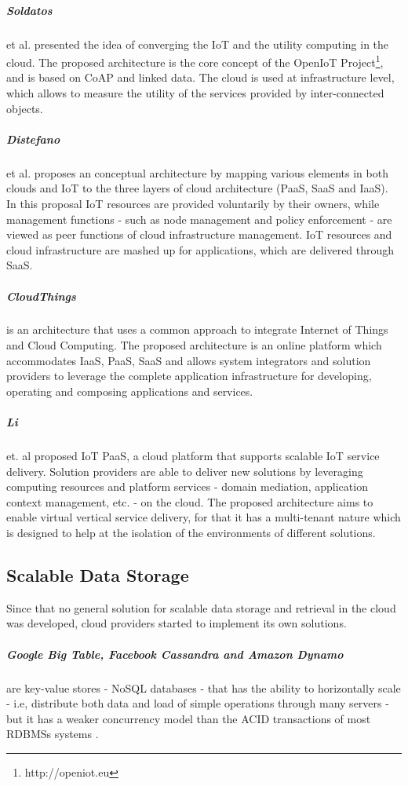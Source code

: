 \subparagraph{Soldatos} et al. \cite{soldatos2012convergence} presented the idea of converging the IoT and the utility computing in the
cloud. The proposed architecture is the core concept of the OpenIoT Project\footnote{http://openiot.eu},
and is based on CoAP \cite{shelby2014constrained} and linked data. The cloud is used at infrastructure
level, which allows to measure the utility of the services provided by inter-connected objects.
\subparagraph{Distefano} et al. \cite{distefano2012enabling} proposes an conceptual architecture by mapping various
elements in both clouds and IoT to the three layers of cloud architecture (\gls{PaaS}, \gls{SaaS} and \gls{IaaS}).
In this proposal IoT resources are provided voluntarily by their owners, while management functions
- such as node management and policy enforcement - are viewed as peer functions of cloud infrastructure
management. IoT resources and cloud infrastructure are mashed up for applications, which are delivered
through \gls{SaaS}.
\subparagraph{CloudThings} \cite{zhou2013cloudthings} is an architecture that uses a common
approach to integrate Internet of Things and Cloud Computing. The proposed architecture is an online
platform which accommodates \gls{IaaS}, \gls{PaaS}, \gls{SaaS} and allows system integrators and
solution providers to leverage the complete application infrastructure for developing, operating
and composing applications and services.
\subparagraph{Li} et. al \cite{li2013efficient} proposed IoT PaaS, a cloud platform that supports
scalable IoT service delivery. Solution providers are able to deliver new solutions by leveraging
computing resources and platform services - domain mediation, application context management, etc.
- on the cloud. The proposed architecture aims to enable virtual vertical service delivery, for that
it has a multi-tenant nature which is designed to help at the isolation of the environments of
different solutions.\\
\subsection{Scalable Data Storage}
\label{sub:data_storage}
Since that no general solution for scalable data storage and retrieval in the cloud was developed,
cloud providers started to implement its own solutions.

\subparagraph{Google Big Table, Facebook Cassandra and  Amazon Dynamo} \cite{chang2008bigtable} \cite{lakshman2010cassandra}
\cite{decandia2007dynamo} are key-value stores - \gls{NoSQL} databases - that has the ability to horizontally scale - i.e,
distribute both data and load of simple operations through many servers - but it has a weaker concurrency model
than the ACID transactions of most \glspl{RDBMS} systems \cite{cattell2011scalable}.

